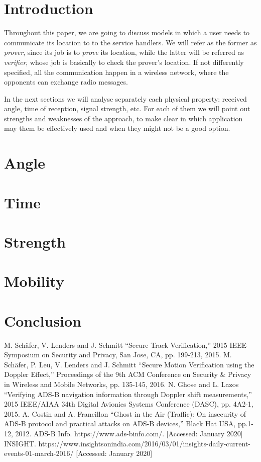 \documentclass[conference]{IEEEtran}
\begin{document}
\section{Introduction}
Throughout this paper, we are going to discuss models in which a user needs to communicate its location to to the service handlers. We will refer as the former as \emph{prover}, since its job is to \emph{prove} its location, while the latter will be referred as \emph{verifier}, whose job is basically to check the prover's location. If not differently specified, all the communication happen in a wireless network, where the opponents can exchange radio messages.

In the next sections we will analyse separately each physical property: received angle, time of reception, signal strength, etc. For each of them we will point out strengths and weaknesses of the approach, to make clear in which application may them be effectively used and when they might not be a good option.

\section{Angle}
%

\section{Time}
%

\section{Strength}
%

\section{Mobility}


\section{Conclusion}

\begin{thebibliography}{00}
 M. Schäfer, V. Lenders and J. Schmitt ``Secure Track Verification,'' 2015 IEEE Symposium on Security and Privacy, San Jose, CA, pp. 199-213, 2015.
 M. Schäfer, P. Leu, V. Lenders and J. Schmitt ``Secure Motion Verification using the Doppler Effect,'' Proceedings of the 9th ACM Conference on Security \& Privacy in Wireless and Mobile Networks, pp. 135-145, 2016.
 N. Ghose and L. Lazos ``Verifying ADS-B navigation information through Doppler shift measurements,'' 2015 IEEE/AIAA 34th Digital Avionics Systems Conference (DASC), pp. 4A2-1, 2015.
 A. Costin and A. Francillon ``Ghost in the Air (Traffic): On insecurity of ADS-B protocol and practical attacks on ADS-B devices,'' Black Hat USA, pp.1-12, 2012.
ADS-B Info. https://www.ads-binfo.com/. [Accessed: January 2020]
INSIGHT. https://www.insightsonindia.com/2016/03/01/insights-daily-current-events-01-march-2016/ [Accessed: January 2020]
\end{thebibliography}
\end{document}

